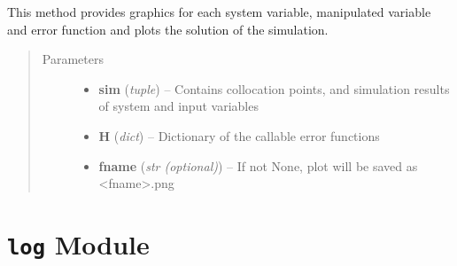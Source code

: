 \documentclass[letterpaper,10pt,english]{sphinxmanual}
\begin{document}
\begin{fulllineitems}
\label{pytrajectory:pytrajectory.utilities.plot}
This method provides graphics for each system variable, manipulated
variable and error function and plots the solution of the simulation.
\begin{quote}\begin{description}
\item[{Parameters}] \leavevmode\begin{itemize}
\item {} 
\textbf{sim} (\emph{tuple}) -- Contains collocation points, and simulation results of system and input variables

\item {} 
\textbf{H} (\emph{dict}) -- Dictionary of the callable error functions

\item {} 
\textbf{fname} (\emph{str (optional)}) -- If not None, plot will be saved as \textless{}fname\textgreater{}.png

\end{itemize}

\end{description}\end{quote}

\end{fulllineitems}


\begin{fulllineitems}
\label{pytrajectory:pytrajectory.utilities.struct}
\end{fulllineitems}



\section{\texttt{log} Module}
\label{pytrajectory:module-pytrajectory.log}\label{pytrajectory:log-module}

\begin{fulllineitems}
\label{pytrajectory:pytrajectory.log.IPS}
\end{fulllineitems}
\end{document}
